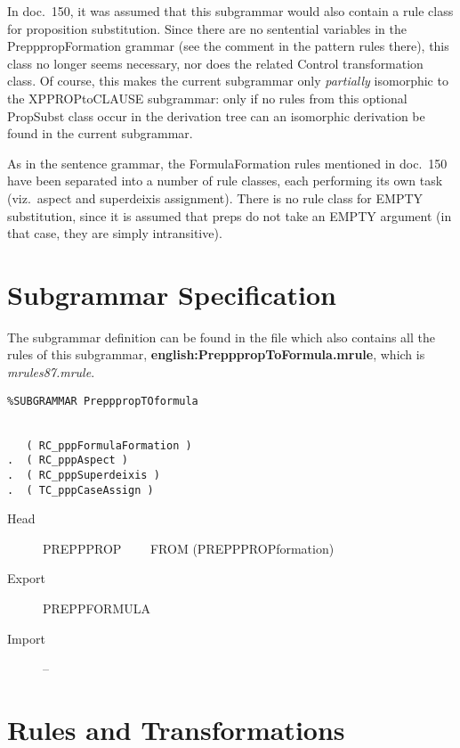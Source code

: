 In doc.\ 150, it was assumed that this subgrammar would also contain a rule 
class for proposition substitution. Since there are no sentential variables in 
the PrepppropFormation grammar (see the comment in the pattern rules there), 
this class no longer seems necessary, nor does the related Control 
transformation class. Of course, this makes the current subgrammar only {\em 
partially\/} isomorphic to the XPPROPtoCLAUSE subgrammar: only if no rules from 
this optional PropSubst class occur in the derivation tree can an isomorphic 
derivation be found in the current subgrammar.

As in the sentence grammar, the FormulaFormation rules mentioned in doc.\ 150 
have been separated into 
a number of rule classes, each performing its own task (viz.\ aspect and 
superdeixis assignment). There is no rule class for EMPTY substitution, since 
it is assumed that preps do not take an EMPTY argument (in that case, they are 
simply intransitive).

\section{Subgrammar Specification}
The subgrammar definition can be found in the file which also contains all the 
rules of this subgrammar, {\bf english:PrepppropToFormula.mrule}, 
which is {\em mrules87.mrule\/}.

\begin{verbatim}
%SUBGRAMMAR PrepppropTOformula


   ( RC_pppFormulaFormation )
.  ( RC_pppAspect )
.  ( RC_pppSuperdeixis )
.  ( TC_pppCaseAssign )

\end{verbatim}

\begin{description}
  \item[Head]  PREPPPROP  \ \ \ \ FROM (PREPPPROPformation)
  \item[Export] PREPPFORMULA
  \item[Import] --
\end{description}

\newpage
\section{Rules and Transformations}

